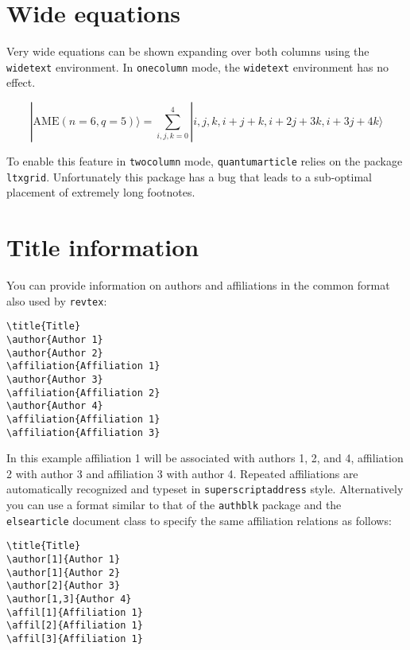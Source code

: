 \documentclass[a4paper,twocolumn,superscriptaddress,11pt,accepted=2017-05-09]{quantumarticle}
\begin{document}
\section{Wide equations}
Very wide equations can be shown expanding over both columns using the \texttt{widetext} environment.
In \texttt{onecolumn} mode, the \texttt{widetext} environment has no effect.
\begin{widetext}
  \begin{equation}
|\mathrm{AME}(n=6,q=5)\rangle=\sum_{i,j,k=0}^4 |i,j,k,i+j+k,i+2j+3k,i+3j+4k\rangle
  \end{equation}
\end{widetext}
To enable this feature in \texttt{twocolumn} mode, \texttt{quantumarticle} relies on the package \texttt{ltxgrid}.
Unfortunately this package has a bug that leads to a sub-optimal placement of extremely long footnotes.

\section{Title information}
You can provide information on authors and affiliations in the common format also used by \texttt{revtex}:
\begin{verbatim}
\title{Title}
\author{Author 1}
\author{Author 2}
\affiliation{Affiliation 1}
\author{Author 3}
\affiliation{Affiliation 2}
\author{Author 4}
\affiliation{Affiliation 1}
\affiliation{Affiliation 3}
\end{verbatim}
In this example affiliation 1 will be associated with authors 1, 2, and 4, affiliation 2 with author 3 and affiliation 3 with author 4.
Repeated affiliations are automatically recognized and typeset in \texttt{superscriptaddress} style.
Alternatively you can use a format similar to that of the \texttt{authblk} package and the \texttt{elsearticle} document class to specify the same affiliation relations as follows:
\begin{verbatim}
\title{Title}
\author[1]{Author 1}
\author[1]{Author 2}
\author[2]{Author 3}
\author[1,3]{Author 4}
\affil[1]{Affiliation 1}
\affil[2]{Affiliation 1}
\affil[3]{Affiliation 1}
\end{verbatim}
\end{document}
